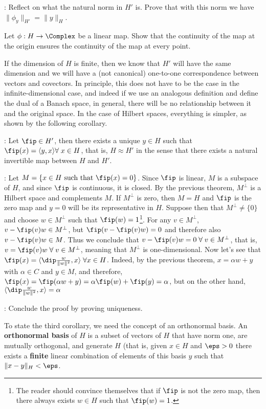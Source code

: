 \ejer: Reflect on what the natural norm in $H'$ is. 
Prove that with this norm we have $\|\phi_y\|_{H'} = \|y\|_H$.
\espa

\bpro
Let $\phi: H \to \Complex$ be a linear map. Show that the continuity
of the map at the origin ensures the continuity of the map at every point.
\epro

If the dimension of $H$ is finite, then we know that
$H'$ will have the same dimension and we will have a
(not canonical) one-to-one correspondence between vectors and covectors.
In principle, this does not have to be the case in the infinite-dimensional case, and indeed if we use an analogous definition and define
the dual of a Banach space, in general, there will be no
relationship between it and the original space.
In the case of Hilbert spaces, everything is simpler, as
shown by the following corollary.

:
Let $\fip \in H'$, then there exists a unique $y \in H$ such that 
$\fip(x) = \langle y,x\rangle \forall \; x \in H$,
that is, $H \approx H'$ in the sense that there exists a natural
invertible map between $H$ and $H'$.
\ecor

\pru: Let $M = \{ x \in H \mbox{ such that } \fip(x)=0\}$. Since $\fip$
is linear, $M$ is a subspace of $H$, and since $\fip$ is continuous, it
is closed. By the previous theorem, $M^{\perp}$ is a Hilbert space and complements $M$. If $M^{\perp}$ is zero, then $M=H$
and $\fip$ is the zero map and $y= 0$ will be its representative 
in $H$.
Suppose then that $M^{\perp} \neq \{0\}$ and choose $w \in M^{\perp}$
such that $\fip (w) = 1$\footnote{The reader should convince themselves that if
$\fip$ is not the zero map, then there always exists $w\in H$ such that 
$\fip(w)=1$.}. 
For any $v \in M^{\perp}$,
$v-\fip(v)w \in M^{\perp}$, but $\fip(v - \fip(v)w) = 0$ and therefore 
also $v-\fip(v)w \in M$. 
Thus we conclude that $v-\fip(v)w =0\; \forall\;
v \in M^{\perp}$, that is, $v=\fip(v)w \;\forall\; v \in M^{\perp}$, meaning that
$M^{\perp}$ is one-dimensional. Now let's see that 
$\fip(x) = \langle\dip\frac w{\|w\|^2},x\rangle \; \forall x \in H$.
Indeed, by the previous theorem, $x = \alpha w + y$ with $\alpha \in C$
and $y \in M$, and therefore, 
$\fip(x) = \fip(\alpha w + y) = \alpha \fip(w) + \fip(y) = \alpha$,
but on the other hand,
$\langle\dip\frac w{\|w\|^2},x\rangle = \alpha$ 
\epru
\espa

\ejer: Conclude the proof by proving uniqueness. 
\espa

To state the third corollary, we need
the concept of an orthonormal basis.
An {\bf orthonormal basis} of $H$ is a subset of vectors
of $H$ that have norm one, are mutually orthogonal,
and generate $H$ (that is, given $x \in H$ and $\eps > 0$
there exists a {\bf finite} linear combination of elements of this basis $y$ such
that $\|x-y\|_H < \eps $.

